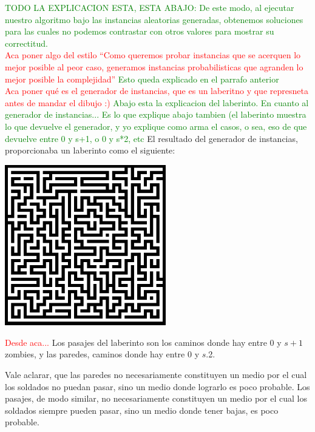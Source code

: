 \textcolor{green}{TODO LA EXPLICACION ESTA, ESTA ABAJO: De este modo, al ejecutar nuestro algoritmo bajo las instancias aleatorias generadas, obtenemos soluciones para las cuales no podemos contrastar con otros valores para mostrar su correctitud. }\\

\textcolor{red}{Aca poner algo del estilo ``Como queremos probar instancias que se acerquen lo mejor posible al peor caso, generamos instancias probabilisticas que agranden lo mejor posible la complejidad''}
\textcolor{green}{Esto queda explicado en el parrafo anterior}\\

\textcolor{red}{Aca poner qu\'e es el generador de instancias, que es un laberitno y que represneta antes de mandar el dibujo :)}
\textcolor{green}{Abajo esta la explicacion del laberinto. En cuanto al generador de instancias... Es lo que explique abajo tambien (el laberinto muestra lo que devuelve el generador, y yo explique como arma el casos, o sea, eso de que devuelve entre 0 y s+1, o 0 y s*2, etc}
El resultado del generador de instancias, proporcionaba un laberinto como el siguiente:

\begin{center}
\includegraphics[width=7cm,keepaspectratio=yes]{imagenes/ej2/maze.png}
\end{center}

\textcolor{red}{Desde aca...}
Los pasajes del laberinto son los caminos donde hay entre $0$ y $s+1$ zombies, y las paredes, caminos donde hay entre $0$ y $s$.2.

Vale aclarar, que las paredes no necesariamente constituyen un medio por el cual los soldados no puedan pasar, sino un medio donde lograrlo es poco probable. Los pasajes, de modo similar, no necesariamente constituyen un medio por el cual los soldados siempre pueden pasar, sino un medio donde tener bajas, es poco probable.

